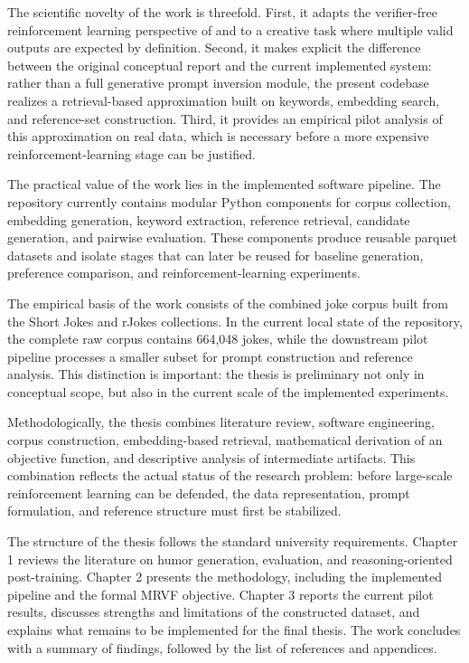 \documentclass[14pt,a4paper]{extreport}
\begin{document}
The scientific novelty of the work is threefold. First, it adapts the verifier-free reinforcement learning perspective of \citet{Zhou2025} and \citet{Yu2025} to a creative task where multiple valid outputs are expected by definition. Second, it makes explicit the difference between the original conceptual report and the current implemented system: rather than a full generative prompt inversion module, the present codebase realizes a retrieval-based approximation built on keywords, embedding search, and reference-set construction. Third, it provides an empirical pilot analysis of this approximation on real data, which is necessary before a more expensive reinforcement-learning stage can be justified.

The practical value of the work lies in the implemented software pipeline. The repository currently contains modular Python components for corpus collection, embedding generation, keyword extraction, reference retrieval, candidate generation, and pairwise evaluation. These components produce reusable parquet datasets and isolate stages that can later be reused for baseline generation, preference comparison, and reinforcement-learning experiments.

The empirical basis of the work consists of the combined joke corpus built from the Short Jokes and rJokes collections. In the current local state of the repository, the complete raw corpus contains 664{,}048 jokes, while the downstream pilot pipeline processes a smaller subset for prompt construction and reference analysis. This distinction is important: the thesis is preliminary not only in conceptual scope, but also in the current scale of the implemented experiments.

Methodologically, the thesis combines literature review, software engineering, corpus construction, embedding-based retrieval, mathematical derivation of an objective function, and descriptive analysis of intermediate artifacts. This combination reflects the actual status of the research problem: before large-scale reinforcement learning can be defended, the data representation, prompt formulation, and reference structure must first be stabilized.

The structure of the thesis follows the standard university requirements. Chapter 1 reviews the literature on humor generation, evaluation, and reasoning-oriented post-training. Chapter 2 presents the methodology, including the implemented pipeline and the formal MRVF objective. Chapter 3 reports the current pilot results, discusses strengths and limitations of the constructed dataset, and explains what remains to be implemented for the final thesis. The work concludes with a summary of findings, followed by the list of references and appendices.
\end{document}
